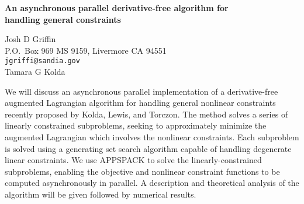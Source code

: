 \documentclass{report}
\begin{document}

\begin{center}
{\large
{\bf An asynchronous parallel derivative-free algorithm for \\
	handling general constraints}}

	Josh D Griffin \\
	P.O.~Box 969 MS 9159,  Livermore CA 94551 \\
	{\tt jgriffi@sandia.gov} \\
	Tamara G Kolda
\end{center}
We will discuss an asynchronous parallel implementation of a
derivative-free augmented Lagrangian algorithm for handling
general nonlinear constraints recently proposed by Kolda,
Lewis, and Torczon. The method solves a series of linearly
constrained subproblems, seeking to approximately minimize
the augmented Lagrangian which involves the nonlinear
constraints. Each subproblem is solved using a generating
set search algorithm capable of handling degenerate linear
constraints. We use APPSPACK to solve the
linearly-constrained subproblems, enabling the objective and
nonlinear constraint functions to be computed asynchronously
in parallel. A description and theoretical analysis of the
algorithm will be given followed by numerical results.



\end{document}
